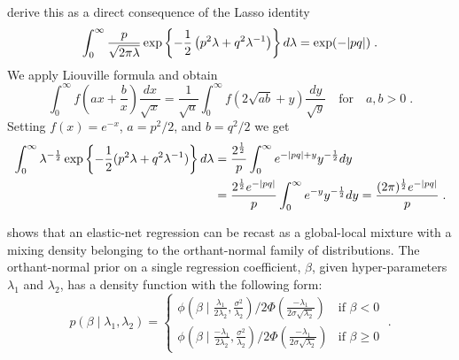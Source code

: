 \documentclass[lineno]{biometrika}
\begin{document}
\citet{polson_data_2011} derive this as a direct consequence of the Lasso identity 
$$
\int_0^{\infty} \frac{p}{\sqrt{2 \pi \lambda}} 
\exp\left\{-\frac{1}{2} \left(p^2 \lambda+q^2 \lambda^{-1}\right)\right\} d\lambda 
= \exp(-|pq|)
\;.
$$ 
We apply Liouville formula and obtain
$$
\int_{0}^{\infty} f\left(ax + \frac{b}{x} \right) \frac{dx}{\sqrt{x}} 
= \frac{1}{\sqrt{a}} \int_{0}^{\infty} f\left(2\sqrt{ab} + y \right) \frac{dy}{\sqrt{y}}
\quad\text{for}\quad a, b > 0
\;.  
$$
Setting $f(x) = e^{-x}$, $a = p^2/2$, and $b = q^2/2$ we get
\begin{align*}
  \int_0^{\infty} \lambda^{-\frac{1}{2}} 
  \exp\left\{-\frac{1}{2}(p^2 \lambda + q^2 \lambda^{-1})\right\} d\lambda 
  &= \frac{2^{\frac{1}{2}}}{p} \int_0^{\infty} e^{-|pq| + y} y^{-\frac{1}{2}} d y 
  \\
  &= \frac{2^{\frac{1}{2}} e^{-|pq|}}{p} \int_0^{\infty} e^{-y} y^{-\frac{1}{2}} d y 
  = \frac{(2\pi)^{\frac{1}{2}} e^{-|pq|}}{p}
  \;.
\end{align*}

\citet{hans2011comment} shows that an elastic-net regression can be recast as a
global-local mixture with a mixing density belonging to the orthant-normal
family of distributions.  The orthant-normal prior on a single regression
coefficient, $\beta$, given hyper-parameters $\lambda_1$ and $\lambda_2$, 
has a density function with the following form:
\begin{equation}
  p(\beta \mid \lambda_1, \lambda_2)  = 
  \begin{cases} 
   \phi(\beta \mid \frac{\lambda_1}{2\lambda_2}, \frac{\sigma^2}{\lambda_2}) 
   / 2\Phi(\frac{-\lambda_1}{2\sigma\sqrt{\lambda_2}}) & \text{if } \beta < 0 
   \\
   \phi(\beta \mid \frac{-\lambda_1}{2\lambda_2}, \frac{\sigma^2}{\lambda_2}) / 
   2\Phi(\frac{-\lambda_1}{2\sigma\sqrt{\lambda_2}}) & \text{if } \beta \geq 0
  \end{cases} 
  \;.
  \label{eq:hans}
\end{equation}
\end{document}
